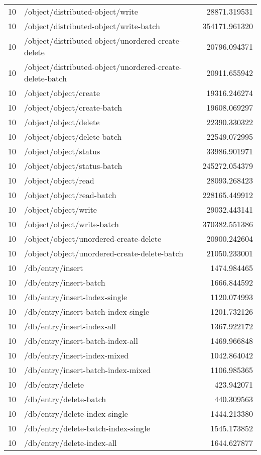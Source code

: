 \begin{longtable}{rlr}
10 & /object/distributed-object/write & 28871.319531 \\
10 & /object/distributed-object/write-batch & 354171.961320 \\
10 & /object/distributed-object/unordered-create-delete & 20796.094371 \\
10 & /object/distributed-object/unordered-create-delete-batch & 20911.655942 \\
10 & /object/object/create & 19316.246274 \\
10 & /object/object/create-batch & 19608.069297 \\
10 & /object/object/delete & 22390.330322 \\
10 & /object/object/delete-batch & 22549.072995 \\
10 & /object/object/status & 33986.901971 \\
10 & /object/object/status-batch & 245272.054379 \\
10 & /object/object/read & 28093.268423 \\
10 & /object/object/read-batch & 228165.449912 \\
10 & /object/object/write & 29032.443141 \\
10 & /object/object/write-batch & 370382.551386 \\
10 & /object/object/unordered-create-delete & 20900.242604 \\
10 & /object/object/unordered-create-delete-batch & 21050.233001 \\
10 & /db/entry/insert & 1474.984465 \\
10 & /db/entry/insert-batch & 1666.844592 \\
10 & /db/entry/insert-index-single & 1120.074993 \\
10 & /db/entry/insert-batch-index-single & 1201.732126 \\
10 & /db/entry/insert-index-all & 1367.922172 \\
10 & /db/entry/insert-batch-index-all & 1469.966848 \\
10 & /db/entry/insert-index-mixed & 1042.864042 \\
10 & /db/entry/insert-batch-index-mixed & 1106.985365 \\
10 & /db/entry/delete & 423.942071 \\
10 & /db/entry/delete-batch & 440.309563 \\
10 & /db/entry/delete-index-single & 1444.213380 \\
10 & /db/entry/delete-batch-index-single & 1545.173852 \\
10 & /db/entry/delete-index-all & 1644.627877 \\

\end{longtable}
